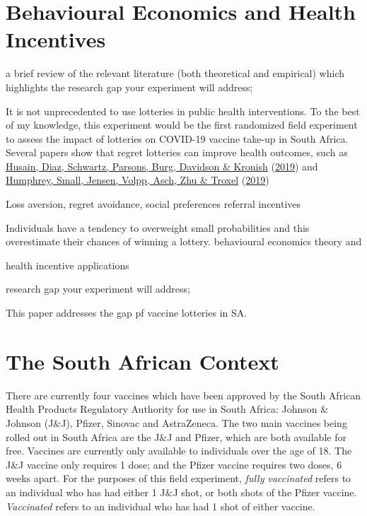 \documentclass[11pt,preprint, authoryear]{elsarticle}
\numberwithin{equation}{section}
\numberwithin{figure}{section}
\numberwithin{table}{section}
\begin{document}
\hypertarget{behavioural-economics-and-health-incentives}{%
\section{\texorpdfstring{Behavioural Economics and Health Incentives
\label{lit}}{Behavioural Economics and Health Incentives }}\label{behavioural-economics-and-health-incentives}}

a brief review of the relevant literature (both theoretical and
empirical) which highlights the research gap your experiment will
address;

It is not unprecedented to use lotteries in public health interventions.
To the best of my knowledge, this experiment would be the first
randomized field experiment to assess the impact of lotteries on
COVID-19 vaccine take-up in South Africa. Several papers show that
regret lotteries can improve health outcomes, such as
\protect\hyperlink{ref-regr}{Husain, Diaz, Schwartz, Parsons, Burg,
Davidson \& Kronish} (\protect\hyperlink{ref-regr}{2019}) and
\protect\hyperlink{ref-adhere}{Humphrey, Small, Jensen, Volpp, Asch, Zhu
\& Troxel} (\protect\hyperlink{ref-adhere}{2019})

Loss aversion, regret avoidance, social preferences referral incentives

Individuals have a tendency to overweight small probabilities and this
overestimate their chances of winning a lottery. behavioural economics
theory and

health incentive applications

research gap your experiment will address;

This paper addresses the gap pf vaccine lotteries in SA.

\hypertarget{the-south-african-context}{%
\section{\texorpdfstring{The South African Context
\label{context}}{The South African Context }}\label{the-south-african-context}}

There are currently four vaccines which have been approved by the South
African Health Products Regulatory Authority for use in South Africa:
Johnson \& Johnson (J\&J), Pfizer, Sinovac and AstraZeneca. The two main
vaccines being rolled out in South Africa are the J\&J and Pfizer, which
are both available for free. Vaccines are currently only available to
individuals over the age of 18. The J\&J vaccine only requires 1 dose;
and the Pfizer vaccine requires two doses, 6 weeks apart. For the
purposes of this field experiment, \emph{fully vaccinated} refers to an
individual who has had either 1 J\&J shot, or both shots of the Pfizer
vaccine. \emph{Vaccinated} refers to an individual who has had 1 shot of
either vaccine.
\end{document}
